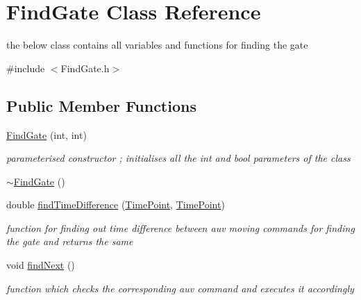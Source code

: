 \hypertarget{classFindGate}{}\section{Find\+Gate Class Reference}
\label{classFindGate}


the below class contains all variables and functions for finding the gate  




{\ttfamily \#include $<$Find\+Gate.\+h$>$}

\subsection*{Public Member Functions}
\begin{DoxyCompactItemize}
\item 
\hyperlink{classFindGate_a2ecdab312288376cc4322dffe2c3eda7}{Find\+Gate} (int, int)
\begin{DoxyCompactList}\small\item\em parameterised constructor ; initialises all the int and bool parameters of the class \end{DoxyCompactList}\item 
\hyperlink{classFindGate_ae4bc3021eab556eb048e0c60ac21e35a}{$\sim$\+Find\+Gate} ()
\item 
double \hyperlink{classFindGate_abce66efcd84add5565a4a60e696eb2a0}{find\+Time\+Difference} (\hyperlink{thruster__driver_8cpp_ad3e807c387dc076de974ff7eac67ad81}{Time\+Point}, \hyperlink{thruster__driver_8cpp_ad3e807c387dc076de974ff7eac67ad81}{Time\+Point})
\begin{DoxyCompactList}\small\item\em function for finding out time difference between auv moving commands for finding the gate and returns the same \end{DoxyCompactList}\item 
void \hyperlink{classFindGate_ab6a173a3ec0bdebb810f1a93edc9600a}{find\+Next} ()
\begin{DoxyCompactList}\small\item\em function which checks the corresponding auv command and executes it accordingly \end{DoxyCompactList}\end{DoxyCompactItemize}
